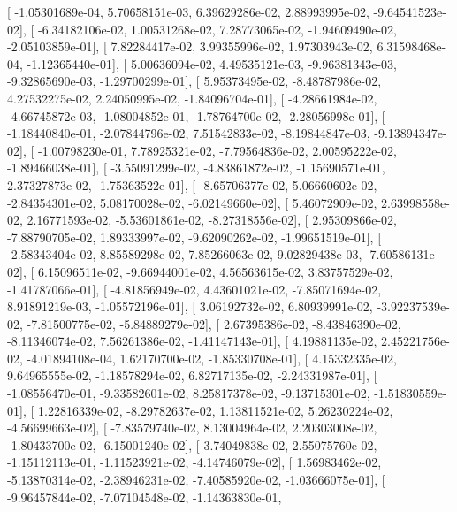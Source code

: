 \documentclass{article}
\begin{document}
       [ -1.05301689e-04,   5.70658151e-03,   6.39629286e-02,
          2.88993995e-02,  -9.64541523e-02],
       [ -6.34182106e-02,   1.00531268e-02,   7.28773065e-02,
         -1.94609490e-02,  -2.05103859e-01],
       [  7.82284417e-02,   3.99355996e-02,   1.97303943e-02,
          6.31598468e-04,  -1.12365440e-01],
       [  5.00636094e-02,   4.49535121e-03,  -9.96381343e-03,
         -9.32865690e-03,  -1.29700299e-01],
       [  5.95373495e-02,  -8.48787986e-02,   4.27532275e-02,
          2.24050995e-02,  -1.84096704e-01],
       [ -4.28661984e-02,  -4.66745872e-03,  -1.08004852e-01,
         -1.78764700e-02,  -2.28056998e-01],
       [ -1.18440840e-01,  -2.07844796e-02,   7.51542833e-02,
         -8.19844847e-03,  -9.13894347e-02],
       [ -1.00798230e-01,   7.78925321e-02,  -7.79564836e-02,
          2.00595222e-02,  -1.89466038e-01],
       [ -3.55091299e-02,  -4.83861872e-02,  -1.15690571e-01,
          2.37327873e-02,  -1.75363522e-01],
       [ -8.65706377e-02,   5.06660602e-02,  -2.84354301e-02,
          5.08170028e-02,  -6.02149660e-02],
       [  5.46072909e-02,   2.63998558e-02,   2.16771593e-02,
         -5.53601861e-02,  -8.27318556e-02],
       [  2.95309866e-02,  -7.88790705e-02,   1.89333997e-02,
         -9.62090262e-02,  -1.99651519e-01],
       [ -2.58343404e-02,   8.85589298e-02,   7.85266063e-02,
          9.02829438e-03,  -7.60586131e-02],
       [  6.15096511e-02,  -9.66944001e-02,   4.56563615e-02,
          3.83757529e-02,  -1.41787066e-01],
       [ -4.81856949e-02,   4.43601021e-02,  -7.85071694e-02,
          8.91891219e-03,  -1.05572196e-01],
       [  3.06192732e-02,   6.80939991e-02,  -3.92237539e-02,
         -7.81500775e-02,  -5.84889279e-02],
       [  2.67395386e-02,  -8.43846390e-02,  -8.11346074e-02,
          7.56261386e-02,  -1.41147143e-01],
       [  4.19881135e-02,   2.45221756e-02,  -4.01894108e-04,
          1.62170700e-02,  -1.85330708e-01],
       [  4.15332335e-02,   9.64965555e-02,  -1.18578294e-02,
          6.82717135e-02,  -2.24331987e-01],
       [ -1.08556470e-01,  -9.33582601e-02,   8.25817378e-02,
         -9.13715301e-02,  -1.51830559e-01],
       [  1.22816339e-02,  -8.29782637e-02,   1.13811521e-02,
          5.26230224e-02,  -4.56699663e-02],
       [ -7.83579740e-02,   8.13004964e-02,   2.20303008e-02,
         -1.80433700e-02,  -6.15001240e-02],
       [  3.74049838e-02,   2.55075760e-02,  -1.15112113e-01,
         -1.11523921e-02,  -4.14746079e-02],
       [  1.56983462e-02,  -5.13870314e-02,  -2.38946231e-02,
         -7.40585920e-02,  -1.03666075e-01],
       [ -9.96457844e-02,  -7.07104548e-02,  -1.14363830e-01,
\end{document}
